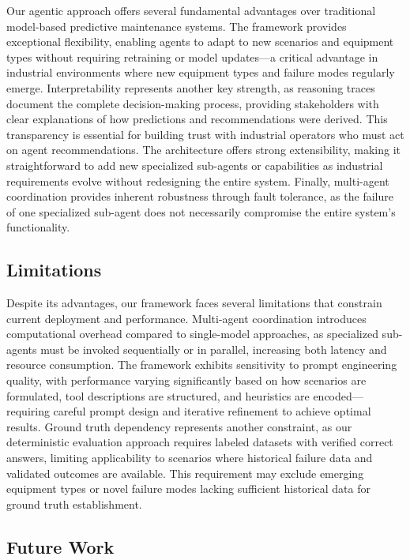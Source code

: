 \documentclass[conference]{IEEEtran}
\begin{document}
Our agentic approach offers several fundamental advantages over traditional model-based predictive maintenance systems. The framework provides exceptional flexibility, enabling agents to adapt to new scenarios and equipment types without requiring retraining or model updates—a critical advantage in industrial environments where new equipment types and failure modes regularly emerge. Interpretability represents another key strength, as reasoning traces document the complete decision-making process, providing stakeholders with clear explanations of how predictions and recommendations were derived. This transparency is essential for building trust with industrial operators who must act on agent recommendations. The architecture offers strong extensibility, making it straightforward to add new specialized sub-agents or capabilities as industrial requirements evolve without redesigning the entire system. Finally, multi-agent coordination provides inherent robustness through fault tolerance, as the failure of one specialized sub-agent does not necessarily compromise the entire system's functionality.

\subsection{Limitations}

Despite its advantages, our framework faces several limitations that constrain current deployment and performance. Multi-agent coordination introduces computational overhead compared to single-model approaches, as specialized sub-agents must be invoked sequentially or in parallel, increasing both latency and resource consumption. The framework exhibits sensitivity to prompt engineering quality, with performance varying significantly based on how scenarios are formulated, tool descriptions are structured, and heuristics are encoded—requiring careful prompt design and iterative refinement to achieve optimal results. Ground truth dependency represents another constraint, as our deterministic evaluation approach requires labeled datasets with verified correct answers, limiting applicability to scenarios where historical failure data and validated outcomes are available. This requirement may exclude emerging equipment types or novel failure modes lacking sufficient historical data for ground truth establishment.

\subsection{Future Work}
\end{document}
